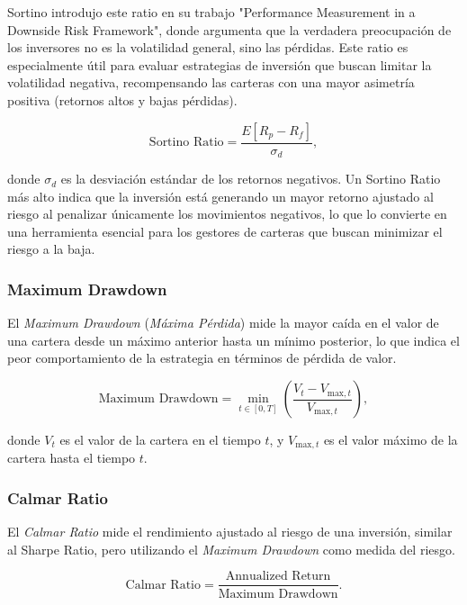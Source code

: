 \documentclass[a4paper,12pt, twoside]{report}
\begin{document}
Sortino introdujo este ratio en su trabajo "Performance Measurement in a Downside Risk Framework", donde 
argumenta que la verdadera preocupación de los inversores no es la volatilidad general, sino las pérdidas. 
Este ratio es especialmente útil para evaluar estrategias de inversión que buscan limitar la volatilidad negativa, 
recompensando las carteras con una mayor asimetría positiva (retornos altos y bajas pérdidas).

\begin{equation}
\text{Sortino Ratio} = \frac{E[R_p - R_f]}{\sigma_{d}},
\end{equation}

donde $\sigma_{d}$ es la desviación estándar de los retornos negativos. Un Sortino Ratio más alto 
indica que la inversión está generando un mayor retorno ajustado al riesgo al penalizar únicamente 
los movimientos negativos, lo que lo convierte en una herramienta esencial para los gestores de 
carteras que buscan minimizar el riesgo a la baja.

\subsubsection{Maximum Drawdown}

El \textit{Maximum Drawdown} (\textit{Máxima Pérdida}) mide la mayor caída en el valor de una cartera desde un máximo anterior hasta un mínimo posterior, lo que indica el peor comportamiento de la estrategia en términos de pérdida de valor.

\begin{equation}
\text{Maximum Drawdown} = \min_{t \in [0,T]} \left(\frac{V_t - V_{\text{max}, t}}{V_{\text{max}, t}}\right),
\end{equation}

donde $V_t$ es el valor de la cartera en el tiempo $t$, y $V_{\text{max}, t}$ es el valor máximo de la cartera hasta el tiempo $t$.

\subsubsection{Calmar Ratio}

El \textit{Calmar Ratio} mide el rendimiento ajustado al riesgo de una inversión, similar al Sharpe Ratio, pero utilizando el \textit{Maximum Drawdown} como medida del riesgo.

\begin{equation}
\text{Calmar Ratio} = \frac{\text{Annualized Return}}{\text{Maximum Drawdown}}.
\end{equation}
\end{document}
